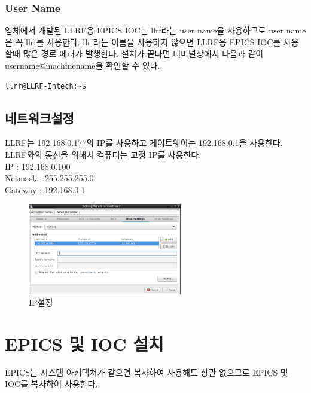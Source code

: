 \documentclass[11pt
  , a4paper
  , article
  , oneside
]{memoir}
\begin{document}
\subsection{User Name}
업체에서 개발된 LLRF용 EPICS IOC는 llrf라는 user name을 사용하므로 user name은 꼭 llrf를 사용한다. llrf라는 이름을 사용하지 않으면 LLRF용 EPICS IOC를 사용할때 많은 경로 에러가 발생한다. 설치가 끝나면 터미널상에서 다음과 같이 username@machinename을 확인할 수 있다.
\begin{lstlisting}[style=termstyle]
llrf@LLRF-Intech:~$
\end{lstlisting}
\section{네트워크설정}
LLRF는 192.168.0.177의 IP를 사용하고 게이트웨이는 192.168.0.1을 사용한다. LLRF와의 통신을 위해서 컴퓨터는 고정 IP를 사용한다.\\
IP : 192.168.0.100\\
Netmask : 255.255.255.0\\
Gateway : 192.168.0.1\\
\begin{figure}[h!]
	\centering
	\includegraphics[width=0.6\textwidth, height=0.6\textwidth]{./images/4.png}
	\caption{IP설정}
\end{figure}
\chapter{EPICS 및 IOC 설치}
EPICS는 시스템 아키텍쳐가 같으면 복사하여 사용해도 상관 없으므로 EPICS 및 IOC를 복사하여 사용한다.
\end{document}
